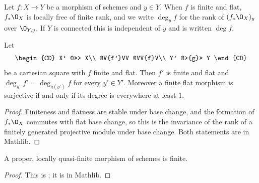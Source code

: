 \begin{definition}\label{def:av-degree}
\leanok
Let $f\colon X\to Y$ be a morphism of schemes and $y\in Y$.  When $f$ is finite
and flat, $f_*\O_X$ is locally free of finite rank, and we write $\deg_yf$ for
the rank of $(f_*\O_X)_y$ over $\O_{Y,y}$.  If $Y$ is connected this is
independent of $y$ and is written $\deg f$.
\end{definition}

\begin{lemma}
\label{lem:av-degree-base-change}
\leanok
Let
\[
  \begin{CD}
    X'     @>>>   X\\
    @V{f'}VV      @VV{f}V\\
    Y'     @>{g}>> Y
  \end{CD}
\]
be a cartesian square with $f$ finite and flat.  Then $f'$ is finite and flat
and $\deg_{y'}f'=\deg_{g(y')}f$ for every $y'\in Y'$.  Moreover a finite flat
morphism is surjective if and only if its degree is everywhere at least $1$.
\end{lemma}
\begin{proof}
\leanok
Finiteness and flatness are stable under base change, and the formation of
$f_*\O_X$ commutes with flat base change, so this is the invariance of the rank
of a finitely generated projective module under base change.  Both statements
are in Mathlib.
\end{proof}

\begin{theorem}
\label{thm:av-zariski-main}
\leanok
A proper, locally quasi-finite morphism of schemes is finite.
\end{theorem}
\begin{proof}
\leanok
This is ; it is in Mathlib.
\end{proof}

